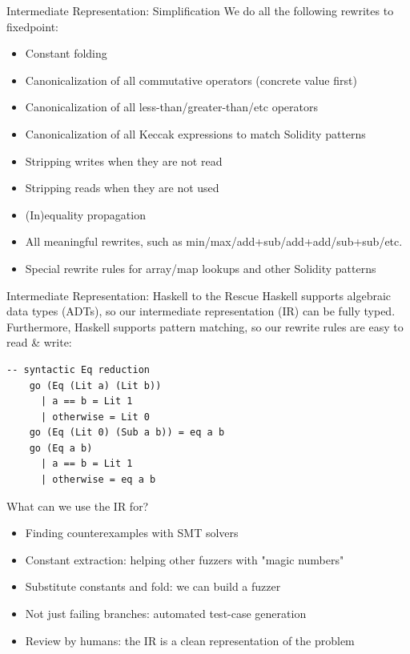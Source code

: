 \documentclass[aspectratio=169]{beamer}
\begin{document}
 \begin{frame}[fragile=singleslide]{Intermediate Representation: Simplification}
 We do all the following rewrites to fixedpoint:
 \begin{itemize}
     \item Constant folding
     \item Canonicalization of all commutative operators (concrete value first)
     \item Canonicalization of all less-than/greater-than/etc operators
     \item Canonicalization of all Keccak expressions to match Solidity patterns
     \item Stripping writes when they are not read
     \item Stripping reads when they are not used
     \item (In)equality propagation
     \item All meaningful rewrites, such as min/max/add+sub/add+add/sub+sub/etc.
     \item Special rewrite rules for array/map lookups and other Solidity patterns
 \end{itemize}
 \end{frame}

\begin{frame}[fragile=singleslide]{Intermediate Representation: Haskell to the Rescue}
Haskell supports algebraic data types (ADTs), so our intermediate representation (IR) can be fully typed. Furthermore, Haskell supports pattern matching, so our rewrite rules are easy to read \& write:
\begin{Verbatim}[frame=single, framerule=0.2mm, framesep=2mm,fontsize=\small]
    -- syntactic Eq reduction
    go (Eq (Lit a) (Lit b))
      | a == b = Lit 1
      | otherwise = Lit 0
    go (Eq (Lit 0) (Sub a b)) = eq a b
    go (Eq a b)
      | a == b = Lit 1
      | otherwise = eq a b
\end{Verbatim}
\end{frame}

\begin{frame}[fragile=singleslide]{What can we use the IR for?}
\begin{itemize}
    \item Finding counterexamples with SMT solvers
    \item Constant extraction: helping other fuzzers with "magic numbers"
    \item Substitute constants and fold: we can build a fuzzer
    \item Not just failing branches: automated test-case generation
    \item Review by humans: the IR is a clean representation of the problem
\end{itemize}
\end{frame}
\end{document}
